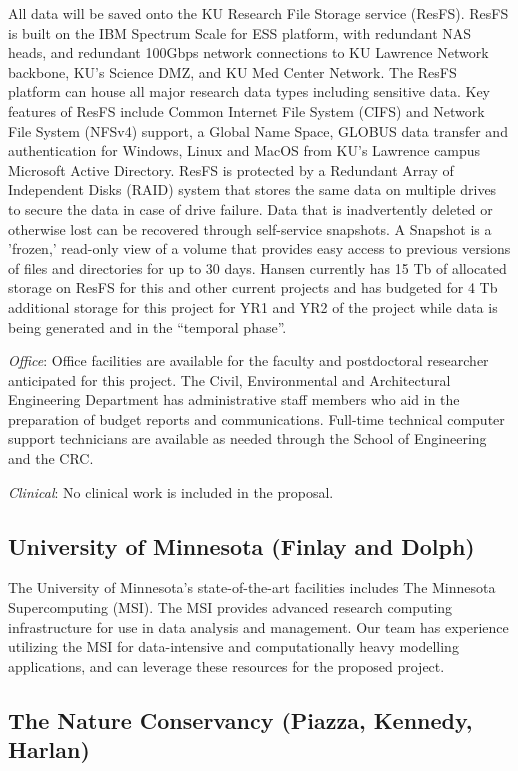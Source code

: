 \documentclass[12pt, class=article, crop=false]{standalone}
\begin{document}
All data will be saved onto the KU Research File Storage service (ResFS).
ResFS is built on the IBM Spectrum Scale for ESS platform, with redundant NAS heads, and redundant 100Gbps network connections to KU Lawrence Network backbone, KU’s Science DMZ, and KU Med Center Network.
The ResFS platform can house all major research data types including sensitive data.
Key features of ResFS include Common Internet File System (CIFS) and Network File System (NFSv4) support, a Global Name Space, GLOBUS data transfer and authentication for Windows, Linux and MacOS from KU’s Lawrence campus Microsoft Active Directory.
ResFS is protected by a Redundant Array of Independent Disks (RAID) system that stores the same data on multiple drives to secure the data in case of drive failure.
Data that is inadvertently deleted or otherwise lost can be recovered through self-service snapshots.
A Snapshot is a 'frozen,' read-only view of a volume that provides easy access to previous versions of files and directories for up to 30 days.
Hansen currently has 15 Tb of allocated storage on ResFS for this and other current projects and has budgeted for 4 Tb additional storage for this project for YR1 and YR2 of the project while data is being generated and in the “temporal phase”. 

\textit{Office}: Office facilities are available for the faculty and postdoctoral researcher anticipated for this project.
The Civil, Environmental and Architectural Engineering Department has administrative staff members who aid in the preparation of budget reports and communications.
Full-time technical computer support technicians are available as needed through the School of Engineering and the CRC.

\textit{Clinical}: No clinical work is included in the proposal.

\subsection*{University of Minnesota (Finlay and Dolph)}

The University of Minnesota’s state-of-the-art facilities includes The Minnesota Supercomputing (MSI).
The MSI provides advanced research computing infrastructure for use in data analysis and management.
Our team has experience utilizing the MSI for data-intensive and computationally heavy modelling applications, and can leverage these resources for the proposed project. 

\subsection*{The Nature Conservancy (Piazza, Kennedy, Harlan)}
\end{document}
